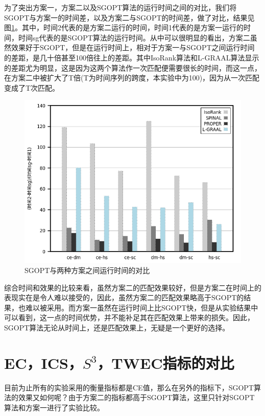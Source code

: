 为了突出方案一，方案二以及SGOPT算法的运行时间之间的对比，我们将SGOPT与方案一的时间差，以及方案二与SGOPT的时间差，做了对比，结果见图\ref{fig:allt-t2}。其中，时间2代表的是方案二运行的时间，时间1代表的是方案一运行的时间，时间sg代表的是SGOPT算法的运行时间。从中可以很明显的看出，方案二虽然效果好于SGOPT，但是在运行时间上，相对于方案一与SGOPT之间运行时间的差距，是几十倍甚至100倍往上的差距。其中IsoRank算法和L-GRAAL算法显示的差距尤为明显，这是因为这两个算法作一次匹配便需要很长的时间，而这一点，在方案二中被扩大了T倍(T为时间序列的跨度，本实验中为100)，因为从一次匹配变成了T次匹配。
\begin{figure}[htbp]
\centering
\includegraphics[height=0.25\textheight]{pic/allt-t2.png}
\caption{SGOPT与两种方案之间运行时间的对比} 
\label{fig:allt-t2}
\end{figure}

综合时间和效果的比较来看，虽然方案二的匹配效果较好，但是方案二在时间上的表现实在是令人难以接受的，因此，虽然方案二的匹配效果略高于SGOPT的结果，也难以被采用。而方案一虽然在运行时间上比SGOPT快，但是从实验结果中可以看到，这一点的时间优势，并不能补足其在匹配效果上带来的损失。因此，SGOPT算法无论从时间上，还是匹配效果上，无疑是一个更好的选择。

\section{EC，ICS，$S^3$，TWEC指标的对比}
目前为止所有的实验采用的衡量指标都是CE值，那么在另外的指标下，SGOPT算法的效果又如何呢？由于方案二的指标都高于SGOPT算法，这里只针对SGOPT算法和方案一进行了实验比较。

